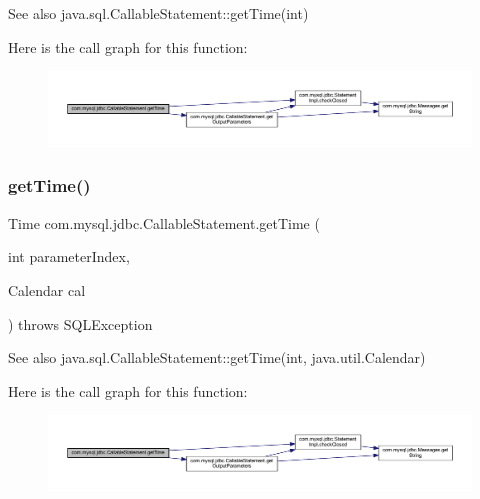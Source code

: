 \begin{DoxySeeAlso}{See also}
java.\+sql.\+Callable\+Statement\+::get\+Time(int) 
\end{DoxySeeAlso}
Here is the call graph for this function\+:\nopagebreak
\begin{figure}[H]
\begin{center}
\leavevmode
\includegraphics[width=350pt]{classcom_1_1mysql_1_1jdbc_1_1_callable_statement_a87f8ac6155e026c518be1266abd3da5c_cgraph}
\end{center}
\end{figure}
\mbox{\label{classcom_1_1mysql_1_1jdbc_1_1_callable_statement_acba23c4f64d5f8dcbf2af7e8fe4239f0}} 
\subsubsection{\texorpdfstring{get\+Time()}{getTime()}\hspace{0.1cm}{\footnotesize\ttfamily [2/4]}}
{\footnotesize\ttfamily Time com.\+mysql.\+jdbc.\+Callable\+Statement.\+get\+Time (\begin{DoxyParamCaption}\item[{int}]{parameter\+Index,  }\item[{Calendar}]{cal }\end{DoxyParamCaption}) throws S\+Q\+L\+Exception}

\begin{DoxySeeAlso}{See also}
java.\+sql.\+Callable\+Statement\+::get\+Time(int, java.\+util.\+Calendar) 
\end{DoxySeeAlso}
Here is the call graph for this function\+:\nopagebreak
\begin{figure}[H]
\begin{center}
\leavevmode
\includegraphics[width=350pt]{classcom_1_1mysql_1_1jdbc_1_1_callable_statement_acba23c4f64d5f8dcbf2af7e8fe4239f0_cgraph}
\end{center}
\end{figure}
\mbox{\label{classcom_1_1mysql_1_1jdbc_1_1_callable_statement_a12256fce41eba515d055b3b2a9d75d0f}} 

